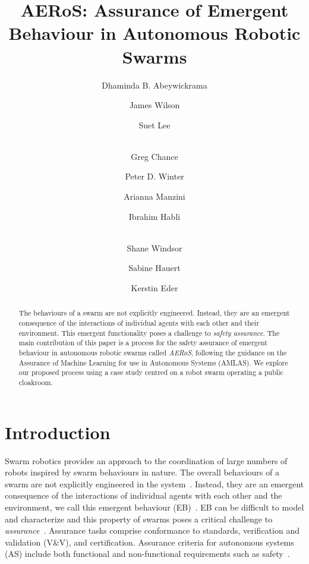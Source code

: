 \documentclass[runningheads]{llncs}
\begin{document}
	\title{AERoS: Assurance of Emergent Behaviour in Autonomous Robotic Swarms}
	\author{Dhaminda B. Abeywickrama\inst{\dag} \and 
		James Wilson\inst{\dag} \and
		Suet Lee \and \\
		Greg Chance \and
		Peter D. Winter \and
		Arianna Manzini \and 
		Ibrahim Habli \and  \\
		Shane Windsor \and
		Sabine Hauert \and
		Kerstin Eder}
	
	
	
	\maketitle    %
	\begin{abstract} 
		The behaviours of a swarm are not explicitly engineered. Instead, they are an emergent consequence of the interactions of individual agents with each other and their environment.
		This emergent functionality poses a challenge to \emph{safety assurance}. 
		The main contribution of this paper is a process for the safety assurance of emergent behaviour in autonomous robotic swarms called \emph{AERoS}, following the guidance on the Assurance of Machine Learning for use in Autonomous Systems (AMLAS). 
		We explore our proposed process using a case study centred on a robot swarm operating a public cloakroom.
	\end{abstract}
	
	
	\section{Introduction}\label{introduction}
	Swarm robotics provides an approach to the coordination of large numbers of robots inspired by swarm behaviours in nature. %
	The overall behaviours of a swarm are not explicitly engineered in the system~\cite{Winfield2006,Abeywickrama2022}. 
	Instead, they are an emergent consequence of the interactions of individual agents with each other and the environment, we call this emergent behaviour (EB)~\cite{Abeywickrama2022}. 
	EB can be difficult to model and characterize and this property of swarms poses a critical challenge to \emph{assurance}~\cite{Cheng2014}. 
	Assurance tasks comprise conformance to standards, verification and validation (V\&V), and certification. Assurance criteria for autonomous systems (AS) include both functional and non-functional requirements such as safety~\cite{Cheng2014}. 
	
\end{document}
